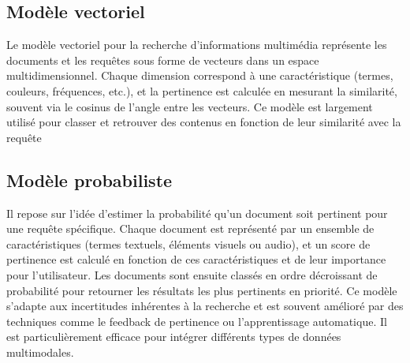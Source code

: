 \begin{section}
 \subsection{Modèle vectoriel}
 Le modèle vectoriel pour la recherche d'informations multimédia représente les
 documents et les requêtes sous forme de vecteurs dans un espace
 multidimensionnel. Chaque dimension correspond à une caractéristique (termes,
 couleurs, fréquences, etc.), et la pertinence est calculée en mesurant la
 similarité, souvent via le cosinus de l'angle entre les vecteurs. Ce modèle est
 largement utilisé pour classer et retrouver des contenus en fonction de leur
 similarité avec la requête
 \subsection{Modèle probabiliste}
 Il repose sur l'idée d'estimer la probabilité qu'un document soit pertinent
 pour une requête spécifique. Chaque document est représenté par un ensemble de
 caractéristiques (termes textuels, éléments visuels ou audio), et un score de
 pertinence est calculé en fonction de ces caractéristiques et de leur
 importance pour l'utilisateur. Les documents sont ensuite classés en ordre
 décroissant de probabilité pour retourner les résultats les plus pertinents en
 priorité. Ce modèle s'adapte aux incertitudes inhérentes à la recherche et est
 souvent amélioré par des techniques comme le feedback de pertinence ou
 l'apprentissage automatique. Il est particulièrement efficace pour intégrer
 différents types de données multimodales. \vfill

\end{section}
